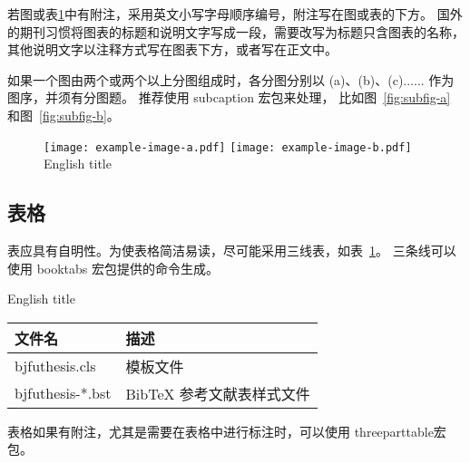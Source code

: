 若图或表\ref{tab:three-line}中有附注，采用英文小写字母顺序编号，附注写在图或表的下方。
国外的期刊习惯将图表的标题和说明文字写成一段，需要改写为标题只含图表的名称，其他说明文字以注释方式写在图表下方，或者写在正文中。

如果一个图由两个或两个以上分图组成时，各分图分别以 (a)、(b)、(c)...... 作为图序，并须有分图题。
推荐使用 subcaption 宏包来处理， 比如图~\ref{fig:subfig-a} 和图~\ref{fig:subfig-b}。



\begin{figure}[h]
	\centering
	{\texttt{[image: example-image-a.pdf]}}
	{\texttt{[image: example-image-b.pdf]}}
	 {English title}

	\label{fig:multi-image}
\end{figure}



\subsection{表格}

表应具有自明性。为使表格简洁易读，尽可能采用三线表，如表~\ref{tab:three-line}。
三条线可以使用 booktabs 宏包提供的命令生成。

\begin{table}[h]
	\xiaowu

	\centering
	 {English title}
	\begin{tabular}{ll}
		\toprule
		文件名           & 描述                      \\
		\midrule
		bjfuthesis.cls   & 模板文件                  \\
		bjfuthesis-*.bst & BibTeX 参考文献表样式文件 \\
		\bottomrule
	\end{tabular}
	\label{tab:three-line}
\end{table}

表格如果有附注，尤其是需要在表格中进行标注时，可以使用 threeparttable宏包。

